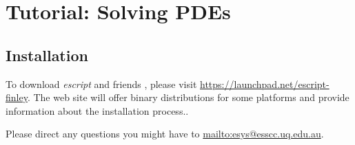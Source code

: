 
%
%
%


\chapter{Tutorial: Solving PDEs}

\section{Installation}
\label{INSTALL}
To download {\it escript} and friends , please visit \url{https://launchpad.net/escript-finley}. 
The web site will offer binary distributions for some platforms and provide information about the installation process..

Please direct any questions you might have to \url{mailto:esys@esscc.uq.edu.au}.






% 
